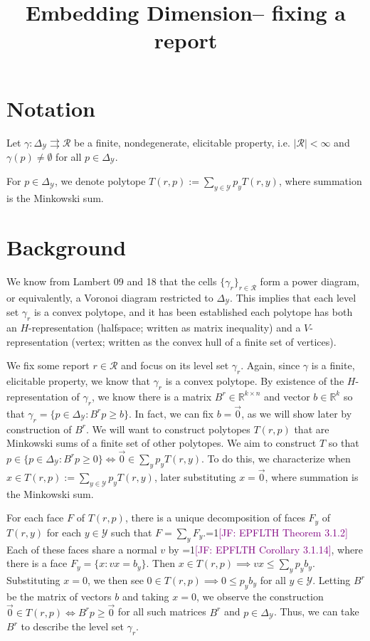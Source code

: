 \documentclass[12pt]{article}
\title{Embedding Dimension-- fixing a report}
\date{}
\newcommand{\Comments}{1}
\newcommand{\mynote}[2]{\ifnum\Comments=1\textcolor{#1}{#2}\fi}
\newcommand{\jessie}[1]{\mynote{purple}{[JF: #1]}}
\newcommand{\reals}{\mathbb{R}}
\newcommand{\simplex}{\Delta_\Y}
\newcommand{\R}{\mathcal{R}}
\newcommand{\Y}{\mathcal{Y}}
\newcommand{\toto}{\rightrightarrows}
\begin{document}
\maketitle

\section*{Notation}
Let $\gamma:\simplex \toto \R$ be a finite, nondegenerate, elicitable property, i.e. $|\R| < \infty$ and $\gamma(p) \neq \emptyset$ for all $p \in \simplex$.

For $p \in \simplex$, we denote polytope $T(r,p) := \sum_{y \in \Y}p_y T(r,y)$, where summation is the Minkowski sum.

\section*{Background}
We know from Lambert 09 and 18 that the cells $\{\gamma_r\}_{r \in \R}$ form a power diagram, or equivalently, a Voronoi diagram restricted to $\simplex$.
This implies that each level set $\gamma_r$ is a convex polytope, and it has been established each polytope has both an $H$-representation (halfspace; written as matrix inequality) and a $V$-representation (vertex; written as the convex hull of a finite set of vertices).

We fix some report $r \in \R$ and focus on its level set $\gamma_r$.
Again, since $\gamma$ is a finite, elicitable property, we know that $\gamma_r$ is a convex polytope.
By existence of the $H$-representation of $\gamma_r$, we know there is a matrix $B^r \in \reals^{k \times n}$ and vector $b \in \reals^k$ so that $\gamma_r = \{p \in \simplex : B^r p \geq b\}$.
In fact, we can fix $b = \vec 0$, as we will show later by construction of $B^r$.
We will want to construct polytopes $T(r,p)$ that are Minkowski sums of a finite set of other polytopes.
We aim to construct $T$ so that $p \in \{p \in \simplex : B^r p \geq 0\} \iff \vec 0 \in \sum_y p_y T(r,y)$.
To do this, we characterize when $x \in T(r,p) := \sum_{y \in \Y} p_y T(r,y)$, later substituting $x = \vec 0$, where summation is the Minkowski sum.


For each face $F$ of $T(r,p)$, there is a unique decomposition of faces $F_y$ of $T(r,y)$ for each $y \in \Y$ such that $F = \sum_y F_y$.\jessie{EPFLTH Theorem 3.1.2}
Each of these faces share a normal $v$ by \jessie{EPFLTH Corollary 3.1.14}, where there is a face $F_y = \{x : vx = b_y\}$.
Then $x \in T(r,p) \implies v x \leq \sum_y p_y b_y$.
Substituting $x = 0$, we then see $0 \in T(r,p) \implies 0 \leq p_y b_y$ for all $y \in \Y$.
Letting $B^r$ be the matrix of vectors $b$ and taking $x = 0$, we observe the construction $\vec 0 \in T(r,p) \iff B^rp \geq \vec 0$ for all such matrices $B^r$ and $p \in \simplex$.
Thus, we can take $B^r$ to describe the level set $\gamma_r$.
\end{document}
